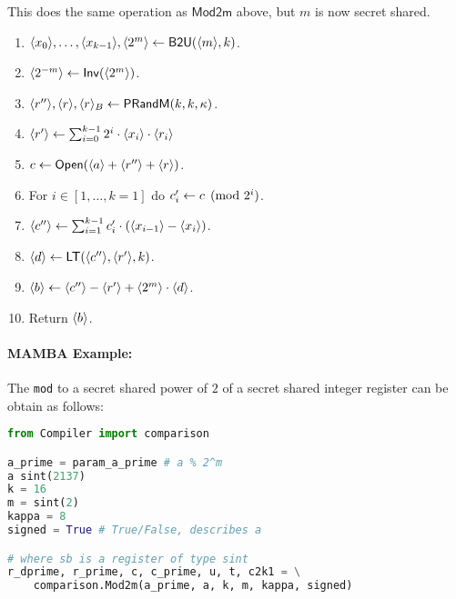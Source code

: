 This does the same operation as $\mathsf{Mod2m}$ above, but $m$ is now secret shared.
\begin{enumerate}
\item $\langle x_0 \rangle,\ldots,\langle x_{k-1} \rangle, \langle 2^m \rangle \leftarrow \mathsf{B2U}(\langle m \rangle,k)$.
\item $\langle 2^{-m} \rangle \leftarrow \mathsf{Inv}(\langle 2^m \rangle)$.
\item $\langle r'' \rangle, \langle r \rangle, \langle r \rangle_B \leftarrow \mathsf{PRandM}(k,k,\kappa)$.
\item $\langle r' \rangle \leftarrow \sum_{i=0}^{k-1} 2^i \cdot \langle x_i \rangle \cdot \langle r_i \rangle$
\item $c \leftarrow {\mathsf{Open}}(\langle a \rangle+\langle r'' \rangle+\langle r \rangle)$.
\item For $i \in [1,\ldots,k=1]$ do $c_i' \leftarrow c \pmod{2^i}$.
\item $\langle c'' \rangle \leftarrow \sum_{i=1}^{k-1} c_i' \cdot (\langle x_{i-1} \rangle-\langle x_i \rangle)$.
\item $\langle d \rangle \leftarrow \mathsf{LT}(\langle c'' \rangle,\langle r' \rangle,k)$.
\item $\langle b \rangle \leftarrow \langle c'' \rangle-\langle r' \rangle+\langle 2^m \rangle \cdot \langle d \rangle$.
\item Return $\langle b \rangle$.
\end{enumerate}

\paragraph{MAMBA Example:} The \verb|mod| to a secret shared power of $2$ of a secret shared integer register can be obtain as follows: 
\begin{lstlisting}[language={python}]
from Compiler import comparison

a_prime = param_a_prime # a % 2^m
a sint(2137)
k = 16
m = sint(2)
kappa = 8  
signed = True # True/False, describes a

# where sb is a register of type sint
r_dprime, r_prime, c, c_prime, u, t, c2k1 = \
    comparison.Mod2m(a_prime, a, k, m, kappa, signed)
\end{lstlisting}


